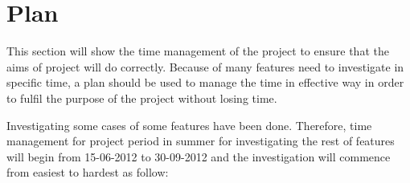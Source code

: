 \documentclass[12pt]{report}
\begin{document}
\section{Plan}
\label{section: plan}

This section will show the time management of the project to ensure that the aims of project will do correctly.  Because of many features need to investigate in specific time, a plan should be used to manage the time in effective way in order to fulfil the purpose of the project without losing time.

Investigating some cases of some features have been done. Therefore, time management for project period in summer for investigating the rest of features will begin from 15-06-2012 to 30-09-2012 and the investigation will commence from easiest to hardest as follow:
\end{document}
